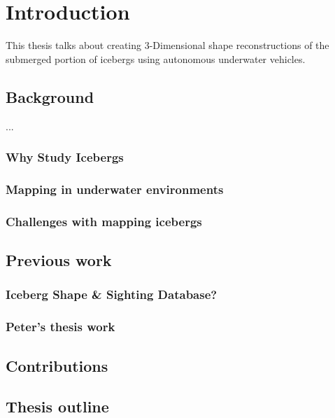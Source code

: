 
\chapter{Introduction}
\label{ch.Introduction}
This thesis talks about creating 3-Dimensional shape reconstructions of the submerged portion of icebergs using autonomous underwater vehicles.

\section{Background}
...
\subsection{Why Study Icebergs}

\subsection{Mapping in underwater environments}
\subsection{Challenges with mapping icebergs}


\section{Previous work}
\subsection{Iceberg Shape \& Sighting Database?}
\subsection{Peter's thesis work}


\section{Contributions}

\section{Thesis outline}
